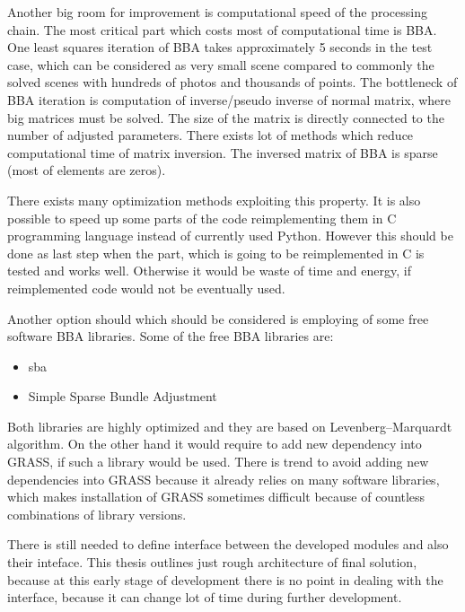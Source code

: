 \documentclass[a4paper,12pt]{article}
\begin{document}
Another big room for improvement is computational speed of the processing chain.
The most critical part which costs most of computational time is BBA.
One least squares  iteration of BBA takes approximately 5 seconds in the test case, which can be 
considered as very small scene compared to commonly the solved
scenes with hundreds of photos and thousands of points. The bottleneck of BBA iteration is computation of inverse/pseudo inverse of normal matrix, 
where big matrices must be solved. 
The size of the matrix is directly connected to the number of adjusted parameters. There exists  lot of methods which reduce computational 
time of matrix inversion. The inversed matrix of BBA is sparse (most of elements are zeros).

There exists many optimization methods exploiting this property. 
It is also possible to speed up some parts of the code reimplementing them in C programming language instead of currently used Python. However this should be done 
as last step when the part, which is going to be reimplemented in C is tested and works well. Otherwise it would be waste of time and energy, if reimplemented 
code would not be eventually used. 


Another option should which should  be considered is employing of some free software BBA libraries.
Some of the free BBA libraries are:
\begin{itemize}
\item sba
\item Simple Sparse Bundle Adjustment 
\end{itemize}

Both libraries are highly optimized and they are based on Levenberg–Marquardt algorithm.
On the other hand it would require to add new dependency into GRASS, if such a library would be used. 
There is trend to avoid adding new dependencies into GRASS because it already relies on many software libraries,
which makes installation of GRASS sometimes difficult because of countless combinations of library versions.



There is still needed to define interface between the developed modules and also their inteface. 
This thesis outlines just rough architecture of final solution, because at this early stage of development 
there is no point in dealing with the interface, because it can change lot of time during further development.
\end{document}
